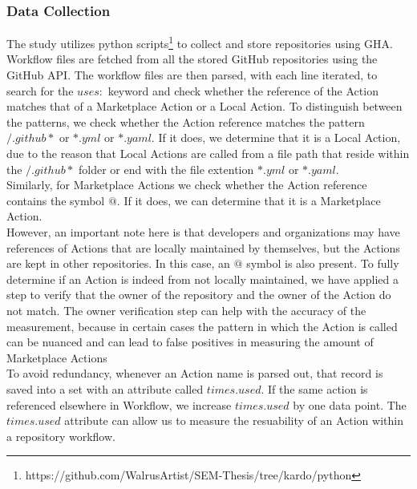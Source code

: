 \documentclass[conference]{IEEEtran}
\begin{document}
          \subsubsection{\textbf{Data Collection}}
            The study utilizes python scripts\footnote{https://github.com/WalrusArtist/SEM-Thesis/tree/kardo/python} to collect and store repositories using GHA. Workflow files are fetched from all the stored GitHub repositories using the GitHub API.  The workflow files are then parsed, with each line iterated, to search for the $uses:$ keyword and check whether the reference of the Action matches that of a Marketplace Action or a Local Action. To distinguish between the patterns, we check whether the Action reference matches the pattern $/.github*$ or $*.yml$ or $*.yaml$. If it does, we determine that it is a Local Action, due to the reason that Local Actions are called from a file path that reside within the $/.github*$ folder or end with the file extention $*.yml$ or $*.yaml$.
            \\ Similarly, for Marketplace Actions we check whether the Action reference contains the symbol $@$. If it does, we can determine that it is a Marketplace Action. \\ However, an important note here is that developers and organizations may have references of Actions that are locally maintained by themselves, but the Actions are kept in other repositories. In this case, an $@$ symbol is also present. To fully determine if an Action is indeed from not locally maintained, we have applied a step to verify that the owner of the repository and the owner of the Action do not match. The owner verification step can help with the accuracy of the measurement, because in certain cases the pattern in which the Action is called can be nuanced and can lead to false positives in measuring the amount of Marketplace Actions\\ 
            To avoid redundancy, whenever an Action name is parsed out, that record is saved into a set with an attribute called $times.used$. If the same action is referenced elsewhere in Workflow, we increase $times.used$ by one data point. The $times.used$ attribute can allow us to measure the resuability of an Action within a repository workflow.\\
\end{document}
